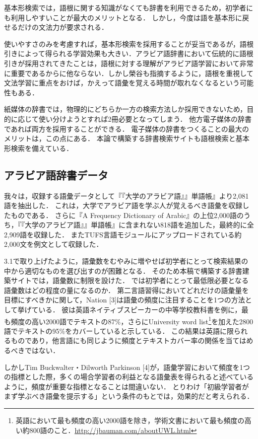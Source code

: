 \documentclass[technicalreport]{ieicej}
\begin{document}
基本形検索では，語根に関する知識がなくても辞書を利用できるため，初学者にも利用しやすいことが最大のメリットとなる．
しかし，今度は語を基本形に戻せるだけの文法力が要求される．

使いやすさのみを考慮すれば，基本形検索を採用することが妥当であるが，語根引きによって得られる学習効果も大きい．アラビア語辞書において伝統的に語根引きが採用されてきたことは，語根に対する理解がアラビア語学習において非常に重要であるからに他ならない．しかし榮谷\cite{sakaedani2008}も指摘するように，語根を重視して文法学習に重点をおけば，かえって語彙を覚える時間が取れなくなるという可能性もある．

紙媒体の辞書では，物理的にどちらか一方の検索方法しか採用できないため，目的に応じて使い分けようとすれば2冊必要となってしまう．
他方電子媒体の辞書であれば両方を採用することができる．
電子媒体の辞書をつくることの最大のメリットは，この点にある．
本論で構築する辞書検索サイトも語根検索と基本形検索を備えている．

\subsection{アラビア語辞書データ}
我々は，収録する語彙データとして『『大学のアラビア語』』単語帳』\cite{aoyama2015}より2,081語を抽出した．
これは，大学でアラビア語を学ぶ人が覚えるべき語彙を収録したものである．
さらに『A Frequency Dictionary of Arabic』の上位2,000語のうち，『『大学のアラビア語』』単語帳』に含まれない818語を追加した，最終的に全2,909語を収録した．
またTUFS言語モジュール\cite{kawaguchi2007}にアップロードされている約2,000文を例文として収録した．

3.1で取り上げたように，語彙数をむやみに増やせば初学者にとって検索結果の中から適切なものを選び出すのが困難となる．
そのため本稿で構築する辞書建築サイトでは，語彙数に制限を設けた．
では初学者にとって最低限必要となる語彙数はどの程度の量になるのか．
第二言語習得においてどれだけの語彙量を目標にすべきかに関して，Nation [3]は語彙の頻度に注目することを1つの方法として挙げている．
彼は英語ネイティブスピーカーの中等学校教科書を例に，最も頻度の高い2000語でテキストの87\%，さらにUniversity word list\footnote{英語において最も頻度の高い2000語を除き，学術文書において最も頻度の高い約800語のこと．\url{http://jbauman.com/aboutUWL.html}}を加えた2800語でテキストの95\%をカバーしていると示している．
この結果は英語に限られるものであり，他言語にも同じように頻度とテキストカバー率の関係を当てはめるべきではない．

しかしTim Buckwalter・Dilworth Parkinson [4]が，語彙学習において頻度を1つの指標とした際，多くの場合学習者の利益となる語彙表を得られると述べているように，頻度が重要な指標となることは間違いない．
とりわけ「初級学習者がまず学ぶべき語彙を提示する」という条件のもとでは，効果的だと考えられる．
\end{document}
